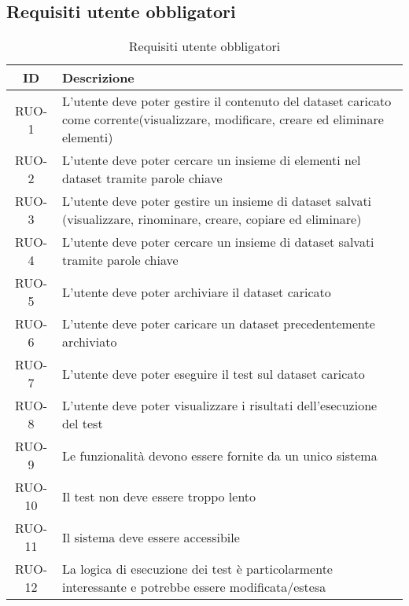 \subsection{Requisiti utente obbligatori}
\begin{table}[H]
    \begin{tabularx}{\textwidth}{|c|X|}
        \hline
        \textbf{ID} & \textbf{Descrizione} \\
        \hline
        \label{ru:RUO-1} RUO-1 & L'utente deve poter gestire il contenuto del dataset caricato come corrente(visualizzare, modificare, creare ed eliminare elementi)\\ 
        \hline
        \label{ru:RUO-2} RUO-2 & L'utente deve poter cercare un insieme di elementi nel dataset tramite parole chiave \\ 
        \hline
        \label{ru:RUO-3} RUO-3 & L'utente deve poter gestire un insieme di dataset salvati (visualizzare, rinominare, creare, copiare ed eliminare)\\ \hline
        \label{ru:RUO-4} RUO-4 & L'utente deve poter cercare un insieme di dataset salvati tramite parole chiave \\ 
        \hline
        \label{ru:RUO-5} RUO-5 & L'utente deve poter archiviare il dataset caricato \\ 
        \hline
        \label{ru:RUO-6} RUO-6 & L'utente deve poter caricare un dataset precedentemente archiviato \\ 
        \hline
        \label{ru:RUO-7} RUO-7 & L'utente deve poter eseguire il test sul dataset caricato \\ \hline
        \label{ru:RUO-8} RUO-8 & L'utente deve poter visualizzare i risultati dell'esecuzione del test \\ \hline
        \label{ru:RUO-9} RUO-9 & Le funzionalità devono essere fornite da un unico sistema\\ \hline
        \label{ru:RUO-10} RUO-10 & Il test non deve essere troppo lento \\ 
        \hline 
        \label{ru:RUO-11} RUO-11 & Il sistema deve essere accessibile \\ 
        \hline
        \label{ru:RUO-12} RUO-12 & La logica di esecuzione dei test è particolarmente interessante e potrebbe essere modificata/estesa \\ 
        \hline 
    \end{tabularx}
    \vspace{10px}
    \caption{Requisiti utente obbligatori}
\end{table}

